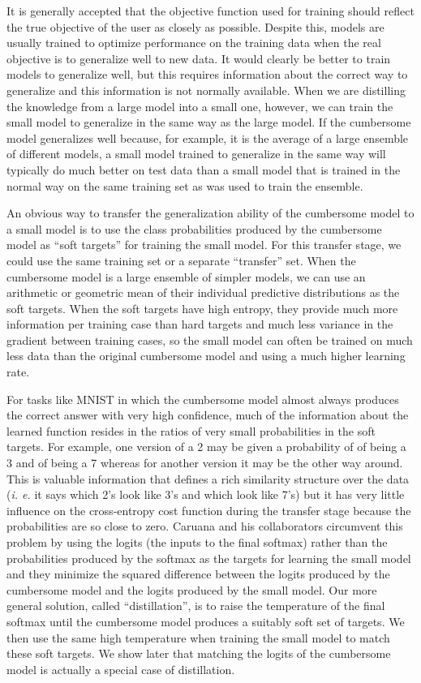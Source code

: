 It is generally accepted that the objective function used for training should reflect the true objective of the user as
closely as possible. Despite this, models are usually trained to optimize performance on the training data when the real
objective is to generalize well to new data. It would clearly be better to train models to generalize well, but this
requires information about the correct way to generalize and this information is not normally available.  When we are
distilling the knowledge from a large model into a small one, however, we can train the small model to generalize in the
same way as the large model. If the cumbersome model generalizes well because, for example, it is the average of a large
ensemble of different models, a small model trained to generalize in the same way will typically do much better on test
data than a small model that is trained in the normal way on the same training set as was used to train the ensemble. 

An obvious way to transfer the generalization ability of the cumbersome model to a small model is to use the class
probabilities produced by the cumbersome model as ``soft targets'' for training the small model. For this transfer
stage, we could use the same training set or a separate ``transfer'' set.  When the
cumbersome model is a large ensemble of simpler models, we can use an arithmetic or geometric mean of their individual predictive distributions as the soft targets.  When the soft
targets have high entropy, they provide much more information per training case than hard targets and much less variance
in the gradient between training cases, so the small model can often be trained on much less data than the original
cumbersome model and using a much higher learning rate.

For tasks like MNIST in which the cumbersome model almost always produces the correct answer with very high confidence,
much of the information about the learned function resides in the ratios of very small probabilities in the soft
targets. For example, one version of a 2 may be given a probability of  of being a 3 and  of being a 7
whereas for another version it may be the other way around. This is valuable information that defines a rich similarity
structure over the data ({\it i. e.} it says which 2's look like 3's and which look like 7's) but it has very little
influence on the cross-entropy cost function during the transfer stage because the probabilities are so close to zero.
Caruana and his collaborators circumvent this problem by using the logits (the inputs to the final softmax) rather than
the probabilities produced by the softmax as the targets for learning the small model and they minimize the squared
difference between the logits produced by the cumbersome model and the logits produced by the small model.  Our more
general solution, called ``distillation'', is to raise the temperature of the final softmax until the cumbersome model
produces a suitably soft set of targets. We then use the same high temperature when training the small model to match
these soft targets. We show later that matching the logits of the cumbersome model is actually a special case of
distillation.

